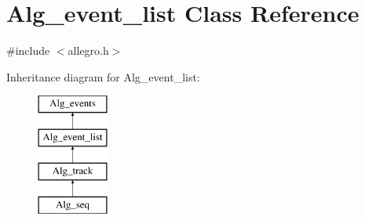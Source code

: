 \hypertarget{class_alg__event__list}{}\section{Alg\+\_\+event\+\_\+list Class Reference}
\label{class_alg__event__list}


{\ttfamily \#include $<$allegro.\+h$>$}

Inheritance diagram for Alg\+\_\+event\+\_\+list\+:\begin{figure}[H]
\begin{center}
\leavevmode
\includegraphics[height=4.000000cm]{class_alg__event__list}
\end{center}
\end{figure}
